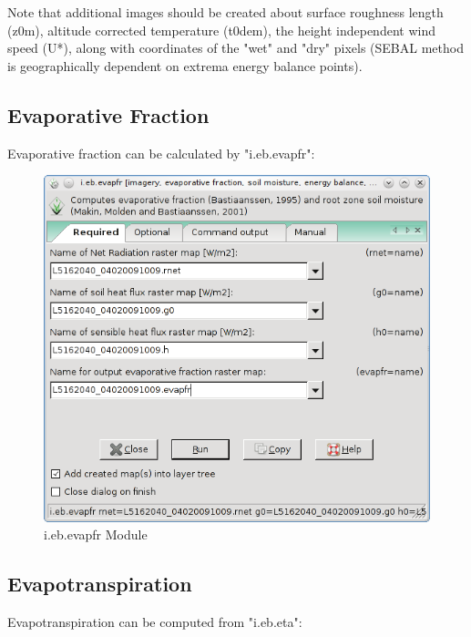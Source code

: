Note that additional images should be created about surface roughness length (z0m), altitude corrected temperature (t0dem), the height independent wind speed (U*), along with coordinates of the "wet" and "dry" pixels (SEBAL method is geographically dependent on extrema energy balance points). \newline

\subsection{Evaporative Fraction}
Evaporative fraction can be calculated by "i.eb.evapfr":\newline

\begin{figure}[htbp]
   \centering
   \includegraphics[scale=0.4]{gipe028.png}
   \caption{i.eb.evapfr Module}
   \label{fig:gipe028}
\end{figure}

\subsection{Evapotranspiration}
Evapotranspiration can be computed from "i.eb.eta":\newline

